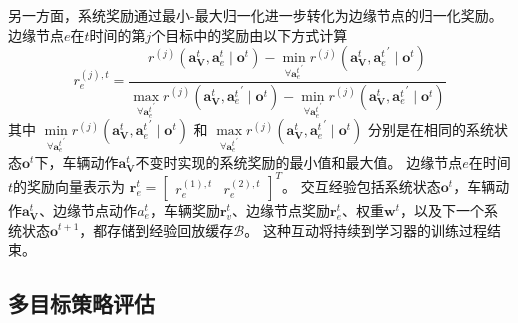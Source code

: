 另一方面，系统奖励通过最小-最大归一化进一步转化为边缘节点的归一化奖励。
边缘节点$e$在$t$时间的第$j$个目标中的奖励由以下方式计算 
\begin{equation}
	r_{e}^{(j), t}= \frac{r^{(j)}\left(\boldsymbol{a}_{\mathbf{V}}^{t},\boldsymbol{a}_{e}^{t} \mid \boldsymbol{o}^{t}\right) - \min \limits_{\forall {\boldsymbol{a}_{e}^{t}}^{\prime}} r^{(j)}\left(\boldsymbol{a}_{\mathbf{V}}^{t}, {\boldsymbol{a}_{e}^{t}}^{\prime} \mid \boldsymbol{o}^{t}\right)} {\max \limits_{\forall {\boldsymbol{a}_{e}^{t}}^{\prime}} r^{(j)}\left(\boldsymbol{a}_{\mathbf{V}}^{t}, {\boldsymbol{a}_{e}^{t}}^{\prime} \mid \boldsymbol{o}^{t}\right) - \min \limits_{\forall {\boldsymbol{a}_{e}^{t}}^{\prime}} r^{(j)}\left(\boldsymbol{a}_{\mathbf{V}}^{t}, {\boldsymbol{a}_{e}^{t}}^{\prime} \mid \boldsymbol{o}^{t}\right)}
\end{equation}
\noindent 其中 $\min \limits_{\forall {\boldsymbol{a}_{e}^{t}}^{\prime}} r^{(j)} (\boldsymbol{a}_{\mathbf{V}}^{t}, {\boldsymbol{a}_{e}^{t}}^{\prime} \mid \boldsymbol{o}^{t})$ 和 $\max \limits_{\forall {\boldsymbol{a}_{e}^{t}}^{\prime}} r^{(j)}(\boldsymbol{a}_{\mathbf{V}}^{t}, {\boldsymbol{a}_{e}^{t}}^{\prime} \mid \boldsymbol{o}^{t})$ 分别是在相同的系统状态$\boldsymbol{o}^{t}$下，车辆动作$\boldsymbol{a}_{\mathbf{V}}^{t}$不变时实现的系统奖励的最小值和最大值。
边缘节点$e$在时间$t$的奖励向量表示为 $\boldsymbol{r}_{e}^{t} = \begin{bmatrix}  r_{e}^{(1), t}  &  r_{e}^{(2), t} \end{bmatrix} ^{T}$。
交互经验包括系统状态$\boldsymbol{o}^{t}$，车辆动作$\boldsymbol{a}_{\mathbf{V}}^{t}$、边缘节点动作${a}_{e}^{t}$，车辆奖励$\boldsymbol{r}_{v}^{t}$、边缘节点奖励$\boldsymbol{r}_{e}^{t}$、权重$\boldsymbol{w}^{t}$，以及下一个系统状态$\boldsymbol{o}^{t+1}$，都存储到经验回放缓存$\mathcal{B}$。
这种互动将持续到学习器的训练过程结束。

\subsection{多目标策略评估}

